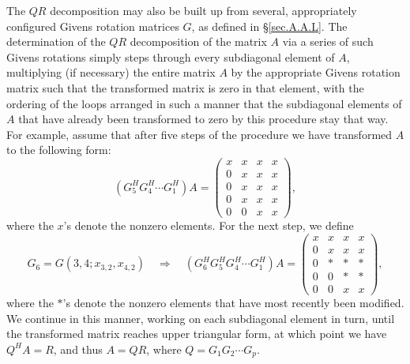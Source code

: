 \noindent The $QR$ decomposition may also be built up from several,
appropriately configured Givens rotation matrices $G$, as defined in
\S \ref{sec.A.A.L}.  The determination of the $QR$ decomposition of the matrix
$A$ via a series of such Givens rotations simply steps through every
subdiagonal element of $A$, multiplying (if necessary) the entire
matrix $A$ by the appropriate Givens rotation matrix such that the
transformed matrix is zero in that element, with the ordering of the
loops arranged in such a manner that the subdiagonal elements of $A$
that have already been transformed to zero by this procedure stay that
way.  For example, assume that after five steps of the procedure
we have transformed $A$ to the following form:
\begin{equation*}
(G^{H}_{5}G^{H}_{4}\cdots G^{H}_{1}) A = \begin{pmatrix} x & x & x & x \\
					     0 & x & x & x \\
					     0 & x & x & x \\
					     0 & x & x & x \\
					     0 & 0 & x & x \end{pmatrix},  
\end{equation*}
where the $x$'s denote the nonzero elements.  For the next step, we define
\begin{equation*}
    G_{6}=G(3,4;x_{3,2},x_{4,2}) \quad \Rightarrow \quad
    (G^{H}_{6}G^{H}_{5}G^{H}_{4}\cdots G^{H}_{1}) A = \begin{pmatrix} x & x & x & x \\
						 0 & x & x & x \\
						 0 & * & * & * \\
						 0 & 0 & * & * \\
						 0 & 0 & x & x \end{pmatrix},  
\end{equation*}
where the $*$'s denote the nonzero elements that have most recently been modified.
We continue in this manner, working on each subdiagonal element in
turn, until the transformed matrix reaches upper triangular form, at which point we have
$Q^{H}A=R$, and thus $A=QR$, where $Q=G_{1}G_{2}\cdots G_{p}$.

\begin{figure*}[t]

\end{figure*}

